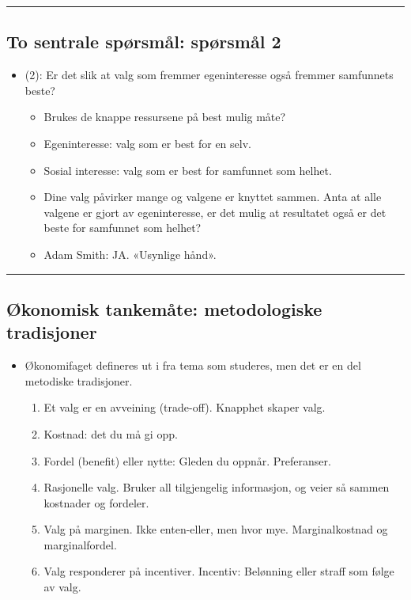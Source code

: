 \documentclass[
  letterpaper,
  DIV=11,
  numbers=noendperiod]{scrartcl}
\providecommand{\tightlist}{%
  \setlength{\itemsep}{0pt}\setlength{\parskip}{0pt}}\usepackage{longtable,booktabs,array}
\begin{document}
\begin{center}\rule{0.5\linewidth}{0.5pt}\end{center}

\subsection{To sentrale spørsmål: spørsmål
2}\label{to-sentrale-spuxf8rsmuxe5l-spuxf8rsmuxe5l-2}

\begin{itemize}
\tightlist
\item
  (2): Er det slik at valg som fremmer egeninteresse også fremmer
  samfunnets beste?

  \begin{itemize}
  \tightlist
  \item
    Brukes de knappe ressursene på best mulig måte?
  \item
    Egeninteresse: valg som er best for en selv.
  \item
    Sosial interesse: valg som er best for samfunnet som helhet.
  \item
    Dine valg påvirker mange og valgene er knyttet sammen. Anta at alle
    valgene er gjort av egeninteresse, er det mulig at resultatet også
    er det beste for samfunnet som helhet?
  \item
    Adam Smith: JA. «Usynlige hånd».
  \end{itemize}
\end{itemize}

\begin{center}\rule{0.5\linewidth}{0.5pt}\end{center}

\subsection{Økonomisk tankemåte: metodologiske
tradisjoner}\label{uxf8konomisk-tankemuxe5te-metodologiske-tradisjoner}

\begin{itemize}
\tightlist
\item
  Økonomifaget defineres ut i fra tema som studeres, men det er en del
  metodiske tradisjoner.

  \begin{enumerate}
  \def\labelenumi{\arabic{enumi}.}
  \tightlist
  \item
    Et valg er en avveining (trade-off). Knapphet skaper valg.
  \item
    Kostnad: det du må gi opp.
  \item
    Fordel (benefit) eller nytte: Gleden du oppnår. Preferanser.
  \item
    Rasjonelle valg. Bruker all tilgjengelig informasjon, og veier så
    sammen kostnader og fordeler.
  \item
    Valg på marginen. Ikke enten-eller, men hvor mye. Marginalkostnad og
    marginalfordel.
  \item
    Valg responderer på incentiver. Incentiv: Belønning eller straff som
    følge av valg.
  \end{enumerate}
\end{itemize}
\end{document}
